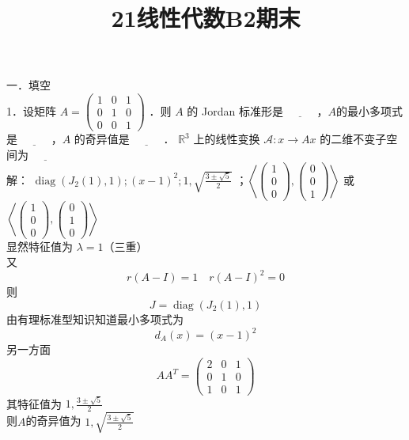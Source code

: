 \documentclass[UTF8]{ctexart}
\title{21线性代数B2期末}
\author{\calligra{NULIOUS}}
\date{}
\begin{document}
\maketitle
\noindent 一．填空\\
1．设矩阵 $A=\left(\begin{array}{lll}1 & 0 & 1 \\ 0 & 1 & 0 \\ 0 & 0 & 1\end{array}\right)$ ．则 $A$ 的 Jordan 标准形是 $\underline{\hspace{1cm}}$ ，$A$的最小多项式是 $\underline{\hspace{1cm}}$ ，$A$ 的奇异值是 $\underline{\hspace{1cm}}$ ． $\mathbb{R}^{3}$ 上的线性变换 $\mathcal{A}: x \rightarrow A x$ 的二维不变子空间为 $\underline{\hspace{1cm}}$\\
解： $\operatorname{diag}\left(J_{2}(1), 1\right) ;(x-1)^{2} ; 1, \sqrt{\frac{3 \pm \sqrt{5}}{2}}$ ；$\left\langle\left(\begin{array}{l}1 \\ 0 \\ 0\end{array}\right),\left(\begin{array}{l}0 \\ 0 \\ 1\end{array}\right)\right\rangle$ 或 $\left\langle\left(\begin{array}{l}1 \\ 0 \\ 0\end{array}\right),\left(\begin{array}{l}0 \\ 1 \\ 0\end{array}\right)\right\rangle$\\
显然特征值为 $\lambda=1$（三重）\\
又 
$$r(A-I)=1 \quad r(A-I)^{2}=0$$
则
$$ J=\operatorname{diag}\left(J_{2}(1), 1\right)$$
由有理标准型知识知道最小多项式为 $$d_{A}(x)=(x-1)^{2}$$
另一方面
$$A A^{T}=\left(\begin{array}{lll}2 & 0 & 1 \\ 0 & 1 & 0 \\ 1 & 0 & 1\end{array}\right)$$
其特征值为 $1, \frac{3 \pm \sqrt{5}}{2}$\\
则$A$的奇异值为 $1, \sqrt{\frac{3 \pm \sqrt{5}}{2}}$\\
\end{document}

